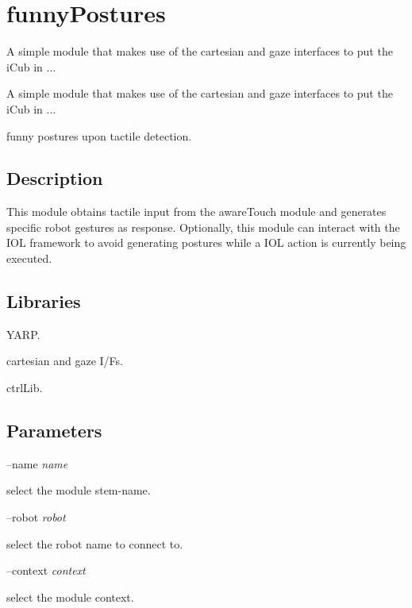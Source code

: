 \section{funny\+Postures}
\label{group__icub__funnyPostures}


A simple module that makes use of the cartesian and gaze interfaces to put the i\+Cub in ...  


A simple module that makes use of the cartesian and gaze interfaces to put the i\+Cub in ... 

funny postures upon tactile detection.\hypertarget{group__icub__iCubWriter_intro_sec}{}\subsection{Description}\label{group__icub__iCubWriter_intro_sec}
This module obtains tactile input from the aware\+Touch module and generates specific robot gestures as response. Optionally, this module can interact with the I\+O\+L framework to avoid generating postures while a I\+O\+L action is currently being executed.\hypertarget{group__icub__iCubWriter_lib_sec}{}\subsection{Libraries}\label{group__icub__iCubWriter_lib_sec}

\begin{DoxyItemize}
\item Y\+A\+R\+P.
\item cartesian and gaze I/\+F\textquotesingle{}s.
\item ctrl\+Lib.
\end{DoxyItemize}\hypertarget{group__icub__iCubWriter_parameters_sec}{}\subsection{Parameters}\label{group__icub__iCubWriter_parameters_sec}
--name {\itshape name} 
\begin{DoxyItemize}
\item select the module stem-\/name.
\end{DoxyItemize}

--robot {\itshape robot} 
\begin{DoxyItemize}
\item select the robot name to connect to.
\end{DoxyItemize}

--context {\itshape context} 
\begin{DoxyItemize}
\item select the module context.
\end{DoxyItemize}

